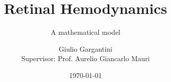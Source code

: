 \documentclass{beamer}
\title{Retinal Hemodynamics}
\subtitle{A mathematical model}
\author[G. Gargantini]{Giulio Gargantini \\[1ex]  {\small Supervisor: Prof. Aurelio Giancarlo Mauri}}
\institute[PoliMI]{Computational Modeling in Electronics and Biomathematics \\[1ex]  {\small Politecnico di Milano}}
\date{\today}
\begin{document}
\begin{frame}
	\titlepage
\end{frame}

\begin{frame}
\end{frame}
\end{document}
